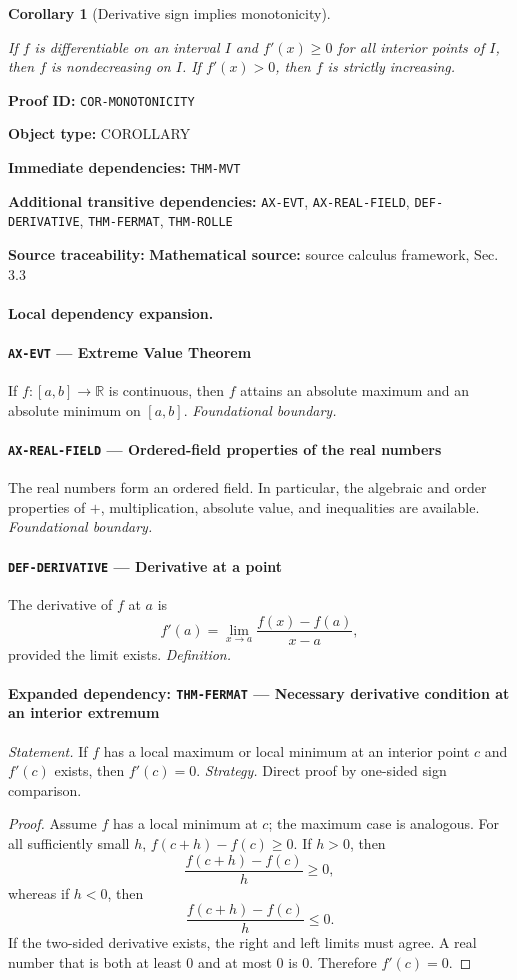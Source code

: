 \documentclass[10pt]{article}
\newcommand{\pidraw}[1]{\begingroup\urlstyle{tt}\nolinkurl{#1}\endgroup}
\newtheorem{corollary}[theorem]{Corollary}
\theoremstyle{definition}
\theoremstyle{remark}
\newcommand{\meta}[2]{\noindent\textbf{#1:} #2\par}
\begin{document}
\begin{corollary}[Derivative sign implies monotonicity]\label{prf:COR-MONOTONICITY}

If $f$ is differentiable on an interval $I$ and $f'(x)\ge0$ for all interior points of $I$, then $f$ is nondecreasing on $I$. If $f'(x)>0$, then $f$ is strictly increasing.

\end{corollary}

\meta{Proof ID}{\pidraw{COR-MONOTONICITY}}
\meta{Object type}{COROLLARY}
\meta{Immediate dependencies}{\pidraw{THM-MVT}}
\meta{Additional transitive dependencies}{\pidraw{AX-EVT}, \pidraw{AX-REAL-FIELD}, \pidraw{DEF-DERIVATIVE}, \pidraw{THM-FERMAT}, \pidraw{THM-ROLLE}}
\meta{Source traceability}{\textbf{Mathematical source:} source calculus framework, Sec. 3.3}

\paragraph{Local dependency expansion.}

\paragraph{\pidraw{AX-EVT} --- Extreme Value Theorem}
If $f:[a,b]\to\mathbb{R}$ is continuous, then $f$ attains an absolute maximum and an absolute minimum on $[a,b]$.
\textit{Foundational boundary.}

\paragraph{\pidraw{AX-REAL-FIELD} --- Ordered-field properties of the real numbers}
The real numbers form an ordered field. In particular, the algebraic and order properties of $+$, multiplication, absolute value, and inequalities are available.
\textit{Foundational boundary.}

\paragraph{\pidraw{DEF-DERIVATIVE} --- Derivative at a point}
The derivative of $f$ at $a$ is
\[
f'(a)=\lim_{x\to a}\frac{f(x)-f(a)}{x-a},
\]
provided the limit exists.
\textit{Definition.}

\paragraph{Expanded dependency: \pidraw{THM-FERMAT} --- Necessary derivative condition at an interior extremum}
\textit{Statement.} If $f$ has a local maximum or local minimum at an interior point $c$ and $f'(c)$ exists, then $f'(c)=0$.
\textit{Strategy.} Direct proof by one-sided sign comparison.
\begin{proof}Assume $f$ has a local minimum at $c$; the maximum case is analogous.
For all sufficiently small $h$,
$f(c+h)-f(c)\ge0$. If $h>0$, then
\[
\frac{f(c+h)-f(c)}{h}\ge0,
\]
whereas if $h<0$, then
\[
\frac{f(c+h)-f(c)}{h}\le0.
\]
If the two-sided derivative exists, the right and left limits must agree.
A real number that is both at least $0$ and at most $0$ is $0$.
Therefore $f'(c)=0$.\end{proof}
\end{document}
